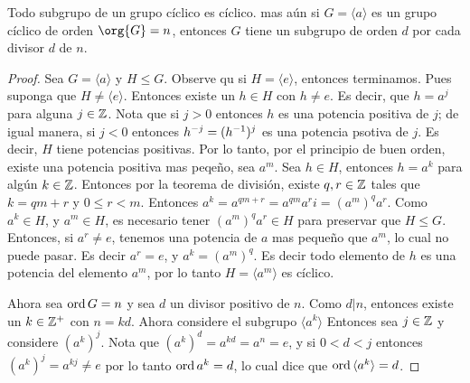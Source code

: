 \begin{theorem}\label{thm_3.3}
    Todo subgrupo de un grupo c\'iclico es c\'iclico. mas a\'un si $G=\langle a
    \rangle$ es un grupo c\'iclico de orden $\org{G}=n$, entonces $G$ tiene un
    subgrupo de orden $d$ por cada divisor $d$ de  $n$.
\end{theorem}
\begin{proof}
    Sea $G=\langle a \rangle$ y $H \leq G$. Observe qu si  $H=\langle e
    \rangle$, entonces terminamos. Pues suponga que $H \neq \langle e \rangle$.
    Entonces existe un $h \in H$ con  $h \neq e$. Es decir, que  $h=a^j$ para
    alguna  $j \in \mathbb{Z}$. Nota que si  $j>0$ entonces  $h$ es una potencia
    positiva de  $j$; de igual manera, si  $j<0$ entonces  $h^{-j}=(h^{-1})^j$
    es una potencia psotiva de $j$. Es decir, $H$ tiene potencias positivas. Por
    lo tanto, por el principio de buen orden, existe una potencia positiva mas
    peqe\~no, sea  $a^m$. Sea  $h \in H$, entonces  $h=a^k$ para alg\'un  $k \in
    \mathbb{Z}$. Entonces por la teorema de divisi\'on, existe  $q,r \in \mathbb{Z}$ tales que
    $k=qm+r$ y $0 \leq r < m$. Entonces $a^k=a^{qm+r}=a^{qm}a^ri=(a^m)^qa^r$.
    Como  $a^k \in H$, y  $a^m \in H$, es necesario tener  $(a^m)^qa^r \in H$
    para preservar que $H \leq G$. Entonces, si  $a^r \neq e$, tenemos una
    potencia de  $a$ mas peque\~no que  $a^m$, lo cual no puede pasar. Es decir
     $a^r=e$, y  $a^k=(a^m)^q$. Es decir todo elemento de $h$ es una potencia
     del elemento $a^m$, por lo tanto $H=\langle a^m \rangle$ es c\'iclico.

     Ahora sea $\operatorname{ord}{G}=n$ y sea $d$ un divisor positivo de  $n$. Como  $d|n$,
     entonces existe un  $k \in \mathbb{Z}^+$ con  $n=kd$. Ahora considere el subgrupo
     $\langle a^k \rangle$ Entonces sea $j \in \mathbb{Z}$ y considere $(a^k)^j$. Nota
     que $(a^k)^d=a^{kd}=a^n=e$, y si $0<d<j$ entonces $(a^k)^j=a^{kj} \neq e$
     por lo tanto $\operatorname{ord}{a^k}=d$, lo cual dice que $\operatorname{ord}{\langle a^k \rangle}=d$.
\end{proof}

